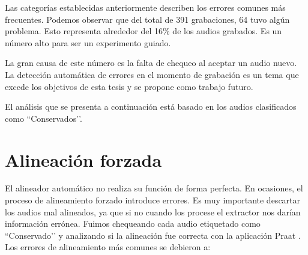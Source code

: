 Las categorías establecidas anteriormente describen los errores comunes más frecuentes. Podemos observar que del total de 391 grabaciones, 64 tuvo algún problema. Esto representa alrededor del 16\% de los audios grabados. Es un número alto para ser un experimento guiado.

La gran causa de este número es la falta de chequeo al aceptar un audio nuevo. La detección automática de errores en el momento de grabación es un tema que excede los objetivos de esta tesis y se propone como trabajo futuro.

El análisis que se presenta a continuación está basado en los audios clasificados como ``Conservados’’.

\section{Alineación forzada}

El alineador automático no realiza su función de forma perfecta. En ocasiones, el proceso de alineamiento forzado introduce errores. Es muy importante descartar los audios mal alineados, ya que si no cuando los procese el extractor nos darían información errónea. Fuimos chequeando cada audio etiquetado como ``Conservado’’ y analizando si la alineación fue correcta con la aplicación Praat \cite{praat}. Los errores de alineamiento más comunes se debieron a:

